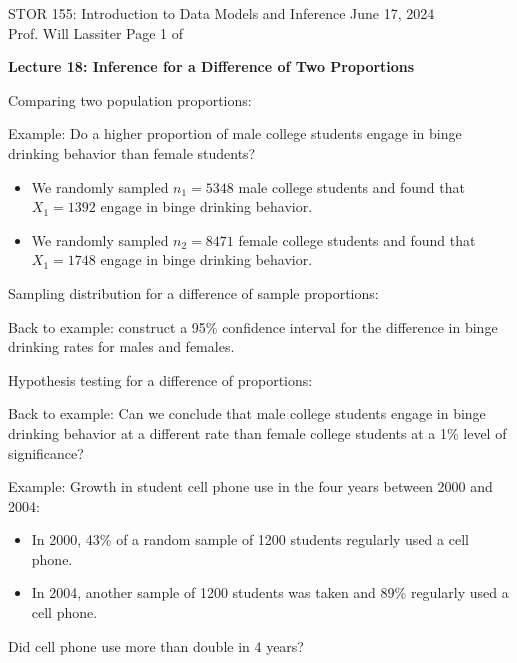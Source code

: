 \documentclass[11pt,letterpaper,twoside]{article}
\newcommand{\whatizit}{Lecture 18: Inference for a Difference of Two Proportions}
\begin{document}
\thispagestyle{empty} \vspace*{-0.75in}

{\bssten STOR 155: Introduction to Data Models and Inference \hfill June 17, 2024 \\
Prof. Will Lassiter  \hfill Page 1 of \pageref{totalpag}}
\vspace{10pt}
\begin{center} {{\Large \bf \whatizit}} \end{center}

Comparing two population proportions: \vspace{400pt}

Example: Do a higher proportion of male college students engage in binge drinking behavior than female students?

\begin{itemize}

\item We randomly sampled $n_1= 5348$ male college students and found that $X_1= 1392$ engage in binge drinking behavior.

\item We randomly sampled $n_2= 8471$ female college students and found that $X_1= 1748$ engage in binge drinking behavior.

\end{itemize}

\newpage

Sampling distribution for a difference of sample proportions: \vspace{200pt}

Back to example: construct a 95\% confidence interval for the difference in binge drinking rates for males and females. \vspace{150pt}

Hypothesis testing for a difference of proportions:

\newpage

Back to example: Can we conclude that male college students engage in binge drinking behavior at a different rate than female college students at a 1\% level of significance? \vspace{250pt}

Example: Growth in student cell phone use in the four years between 2000 and 2004:

\begin{itemize}

\item In 2000, 43\% of a random sample of 1200 students regularly used a cell phone.

\item In 2004, another sample of 1200 students was taken and 89\% regularly used a cell phone.

\end{itemize}

Did cell phone use more than double in 4 years?


\label{totalpag}
\end{document}
